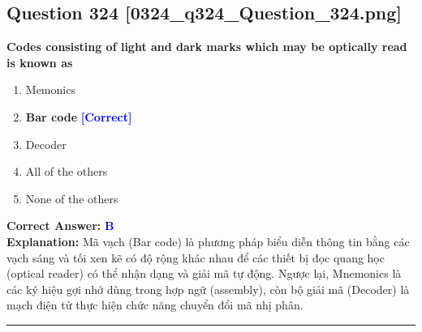 \documentclass[11pt,a4paper]{article}
\begin{document}
\begin{minipage}{\textwidth}
\subsection*{Question 324 \quad \footnotesize{[0324\_q324\_Question\_324.png]}}
\noindent \textbf{Codes consisting of light and dark marks which may be optically read is known as}

\begin{enumerate}[label=\Alph*.]
    \item Memonics
    \item \textbf{Bar code} \hfill \textcolor{blue}{\textbf{[Correct]}}
    \item Decoder
    \item All of the others
    \item None of the others
\end{enumerate}

\noindent \textbf{Correct Answer:} \textcolor{blue}{\textbf{B}} \\[2pt]
\noindent \textbf{Explanation:} Mã vạch (Bar code) là phương pháp biểu diễn thông tin bằng các vạch sáng và tối xen kẽ có độ rộng khác nhau để các thiết bị đọc quang học (optical reader) có thể nhận dạng và giải mã tự động. Ngược lại, Mnemonics là các ký hiệu gợi nhớ dùng trong hợp ngữ (assembly), còn bộ giải mã (Decoder) là mạch điện tử thực hiện chức năng chuyển đổi mã nhị phân.

\par\vspace{0.3cm}
\hrule
\vspace{0.3cm}
\end{minipage}
\end{document}
